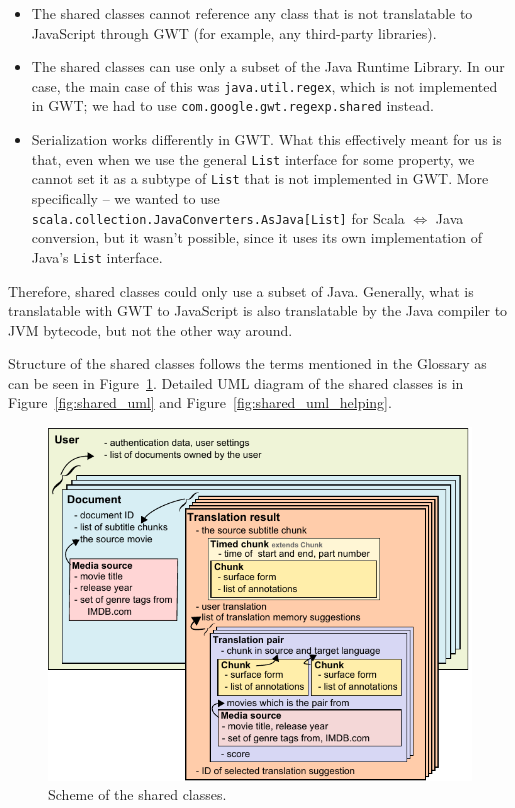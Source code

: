 \begin{itemize}
\item The shared classes cannot reference any class that is not translatable to JavaScript through GWT (for example, any third-party libraries).
\item The shared classes can use only a subset of the Java Runtime Library. In our case, the main case of this was \texttt{java.util.regex}, which is not implemented in GWT; we had to use \texttt{com.google.gwt.regexp.shared} instead.
\item Serialization works differently in GWT. What this effectively meant for us is that, even when we use the general \texttt{List} interface for some property, we cannot set it as a subtype of \texttt{List} that is not implemented in GWT. More specifically -- we wanted to use \texttt{scala.collection.JavaConverters.AsJava[List]} for Scala $\Leftrightarrow$ Java conversion, but it wasn't possible, since it uses its own implementation of Java's \texttt{List} interface.
\end{itemize}

Therefore, shared classes could only use a subset of Java. Generally, what is translatable with GWT to JavaScript is also translatable by the Java compiler to JVM bytecode, but not the other way around.

Structure of the shared classes follows the terms mentioned in the Glossary as can be seen in Figure~\ref{projectStructure:logical}. Detailed UML diagram of the shared classes is in Figure~\ref{fig:shared_uml} and Figure~\ref{fig:shared_uml_helping}.


\begin{figure}[h]
\begin{center}
\includegraphics{figures/shared_classes.pdf}
\end{center}
\caption{Scheme of the shared classes.}\label{projectStructure:logical}
\end{figure}

